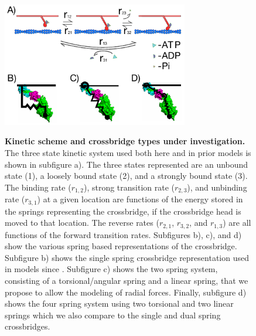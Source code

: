 \documentclass[]{article}
\begin{document}
\begin{figure}[htbp]
    \begin{center}
    \includegraphics[width=3.2in]{../imgs/Figure1.pdf}
    \label{fig:types}
    \caption{
        \textbf{Kinetic scheme and crossbridge types under investigation.} 
        The three state kinetic system used both here and in prior models is shown in subfigure a). The three states represented are an unbound state (1), a loosely bound state (2), and a strongly bound state (3). The binding rate ($r_{1,2}$), strong transition rate ($r_{2,3}$), and unbinding rate ($r_{3,1}$) at a given location are functions of the energy stored in the springs representing the crossbridge, if the crossbridge head is moved to that location. The reverse rates ($r_{2,1}$, $r_{3,2}$, and $r_{1,3}$) are all functions of the forward transition rates.
        Subfigures b), c), and d) show the various spring based representations of the crossbridge. Subfigure b) shows the single spring crossbridge representation used in models since \protect\cite{Huxley:1957:p255}. Subfigure c) shows the two spring system, consisting of a torsional/angular spring and a linear spring, that we propose to allow the modeling of radial forces. Finally, subfigure d) shows the four spring system using two torsional and two linear springs which we also compare to the single and dual spring crossbridges.
    }
    \end{center}
\end{figure}
\end{document}
